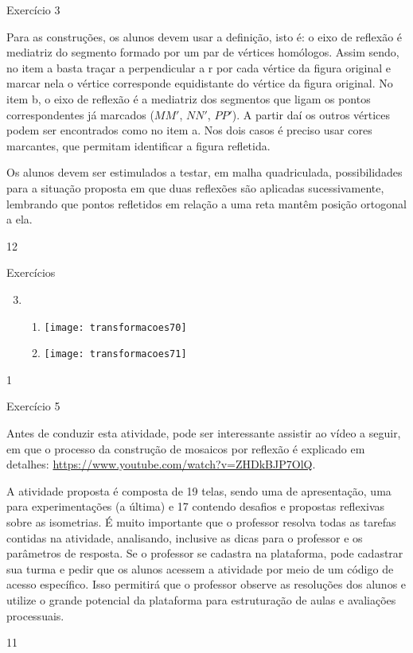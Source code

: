 \begin{sugestions}{Exercício 3}
{
Para as construções, os alunos devem usar a definição, isto é: o eixo de reflexão é mediatriz do segmento formado por um par de vértices homólogos. Assim sendo, no item a basta traçar a perpendicular a r por cada vértice da figura original e marcar nela o vértice corresponde equidistante do vértice da figura original. No item b, o eixo de reflexão é a mediatriz dos segmentos que ligam os pontos correspondentes já marcados ($MM'$, $NN'$, $PP'$). A partir daí os outros vértices podem ser encontrados como no item a. Nos dois casos é preciso usar cores marcantes, que permitam identificar a figura refletida. 


Os alunos devem ser estimulados a testar, em malha quadriculada, possibilidades para a situação proposta em que duas reflexões são aplicadas sucessivamente, lembrando que pontos refletidos em relação a uma reta mantêm posição ortogonal a ela.  
}{1}{2}
\end{sugestions}
\begin{answer}{Exercícios}
{\exerciselist
\begin{enumerate}\setcounter{enumi}{2}
\item
\begin{enumerate}
\item {}
{
\texttt{[image: transformacoes70]}
}
\item {}
{
\texttt{[image: transformacoes71]}
}
\end{enumerate}
\end{enumerate}
}{1}
\end{answer}
\clearmargin
\begin{sugestions}{Exercício 5}
{
Antes de conduzir esta atividade, pode ser interessante assistir ao vídeo a seguir, em que o processo da construção de mosaicos por reflexão é explicado em detalhes: \url{https://www.youtube.com/watch?v=ZHDkBJP7OlQ}.


A atividade proposta é composta de 19 telas, sendo uma de apresentação, uma para experimentações (a última) e 17 contendo desafios e propostas reflexivas sobre as isometrias. É muito importante que o professor resolva todas as tarefas contidas na atividade, analisando, inclusive as dicas para o professor e os parâmetros de resposta. Se o professor se cadastra na plataforma, pode cadastrar sua turma e pedir que os alunos acessem a atividade por meio de um código de acesso específico. Isso permitirá que o professor observe as resoluções dos alunos e utilize o grande potencial da plataforma para estruturação de aulas e avaliações processuais. 
}{1}{1}
\end{sugestions}
